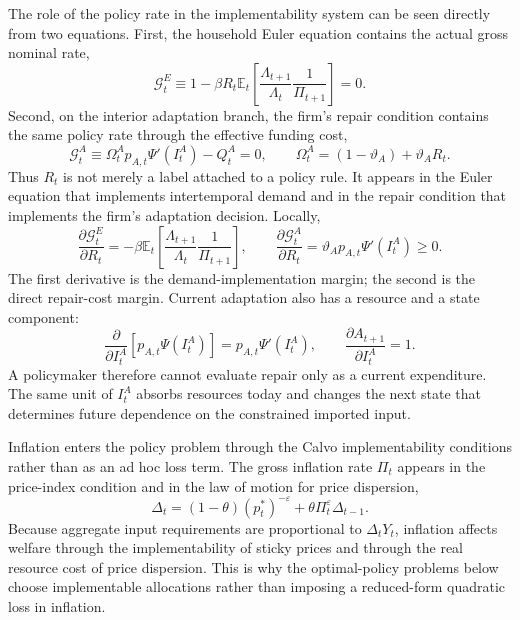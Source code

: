 ﻿\documentclass[12pt]{article}
\theoremstyle{remark}
\newcommand{\E}{\mathbb E}
\begin{document}
The role of the policy rate in the implementability system can be seen directly from two equations.
First, the household Euler equation contains the actual gross nominal rate,
\begin{equation}
    \mathcal G_t^{E}
    \equiv
    1-\beta R_t
    \E_t
    \left[
        \frac{\Lambda_{t+1}}{\Lambda_t}
        \frac{1}{\Pi_{t+1}}
    \right]
    =
    0.
    \label{eq:policy_euler_constraint}
\end{equation}
Second, on the interior adaptation branch, the firm's repair condition contains the same policy
rate through the effective funding cost,
\begin{equation}
    \mathcal G_t^{A}
    \equiv
    \Omega_t^Ap_{A,t}\Psi'(I_t^A)-Q_t^A
    =
    0,
    \qquad
    \Omega_t^A=(1-\vartheta_A)+\vartheta_AR_t.
    \label{eq:policy_adaptation_constraint}
\end{equation}
Thus $R_t$ is not merely a label attached to a policy rule. It appears in the Euler equation that
implements intertemporal demand and in the repair condition that implements the firm's adaptation
decision. Locally,
\begin{equation}
    \frac{\partial \mathcal G_t^{E}}{\partial R_t}
    =
    -\beta
    \E_t
    \left[
        \frac{\Lambda_{t+1}}{\Lambda_t}
        \frac{1}{\Pi_{t+1}}
    \right],
    \qquad
    \frac{\partial \mathcal G_t^{A}}{\partial R_t}
    =
    \vartheta_Ap_{A,t}\Psi'(I_t^A)\ge0.
    \label{eq:R_direct_implementability_derivatives}
\end{equation}
The first derivative is the demand-implementation margin; the second is the direct repair-cost
margin. Current adaptation also has a resource and a state component:
\begin{equation}
    \frac{\partial}{\partial I_t^A}
    \left[p_{A,t}\Psi(I_t^A)\right]
    =
    p_{A,t}\Psi'(I_t^A),
    \qquad
    \frac{\partial A_{t+1}}{\partial I_t^A}=1.
    \label{eq:I_resource_state_margins}
\end{equation}
A policymaker therefore cannot evaluate repair only as a current expenditure. The same unit of
$I_t^A$ absorbs resources today and changes the next state that determines future dependence on the
constrained imported input.

Inflation enters the policy problem through the Calvo implementability conditions rather than as an
ad hoc loss term. The gross inflation rate $\Pi_t$ appears in the price-index condition and in the
law of motion for price dispersion,
\begin{equation}
    \Delta_t
    =
    (1-\theta)(p_t^*)^{-\varepsilon}
    +
    \theta\Pi_t^\varepsilon\Delta_{t-1}.
    \label{eq:policy_dispersion_margin}
\end{equation}
Because aggregate input requirements are proportional to $\Delta_tY_t$, inflation affects welfare
through the implementability of sticky prices and through the real resource cost of price
dispersion. This is why the optimal-policy problems below choose implementable allocations rather
than imposing a reduced-form quadratic loss in inflation.
\end{document}
